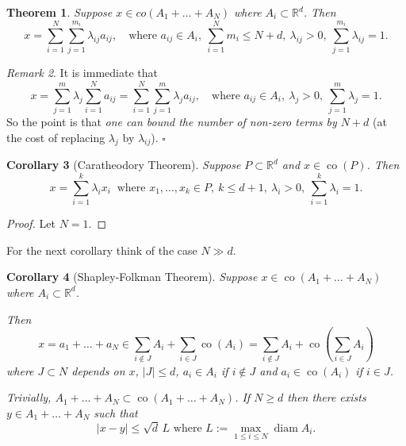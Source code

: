 \documentclass[a4paper]{amsart}
\theoremstyle{plain}
\newtheorem{theorem}{Theorem}[section]
\newtheorem{corollary}[theorem]{Corollary}
\theoremstyle{definition}
\theoremstyle{remark}
\newtheorem{remark}[theorem]{Remark}
\DeclareMathOperator{\co}{co}
\DeclareMathOperator{\diam}{diam}
\begin{document}
\begin{theorem}\label{mth}
Suppose $ x \in co (A_1 + \dots + A_N) $ where $ A_i \subset \mathbb{R}^d  $.  Then
\begin{equation} \label{} 
x = \sum_{i=1}^N \sum_{j=1} ^{m_i} \lambda _{ij} a_{ij} ,
\quad \text{where }  a_{ij}\in A_i,\  \sum_{i=1}^N m_i \leq N + d, \ \lambda _{ij} > 0 ,\ \sum_{j=1}^{m_i} \lambda _{ij} = 1.
\end{equation} 
\end{theorem} 

\begin{remark}\label{rem1}
It is immediate that 
\[
x = \sum_{j=1}^m \lambda _j \sum_{i=1}^N a_{ij} = \sum_{i=1}^N \sum_{j=1} ^{m } \lambda _{j} a_{ij} ,
\quad \text{where }  a_{ij}\in A_i,  \ \lambda _{j} > 0 ,\ \sum_{j=1}^{m } \lambda _{j} = 1.
\]
So the point is that \emph{one can bound the number of non-zero terms by $ N+ d$} (at the cost of replacing $ \lambda _j $ by $ \lambda _{ij} $).
\hfill $\square$  \end{remark} 

 
 \begin{corollary}[Caratheodory Theorem]
 Suppose $ P\subset \mathbb{R}^d  $ and $  x \in \co (P) $. Then
\begin{equation} 
 x = \sum_{i=1}^{ k } \lambda_i x_i\  \text{ where } x_1,\dots , x_k \in P,\  k \leq d+ 1,\  \lambda_i > 0 ,\ \sum_{i=1}^{ k } \lambda_i = 1.
\end{equation} 
\end{corollary}  

\begin{proof}
Let $ N=1 $.
\end{proof}

For the next corollary think of the case $ N \gg d $.
\begin{corollary}[Shapley-Folkman Theorem]  Suppose  $ x \in \co (A_1 + \dots + A_N) $ where $ A_i \subset \mathbb{R}^d  $.  

Then
\begin{equation} \label{sfd}
x = a_1 + \dots + a_N \in \sum_{i\notin J} A_i + \sum _{i\in J} \co(A_i) =  \sum_{i\notin J} A_i + \co \left(\sum _{i\in J}  A_i \right)
\end{equation}
where  $ J \subset N $ depends on $ x $,    $ |J|\leq d $, $ a_i \in A_i $ if $ i \notin J $ and $ a_i \in \co (A_i ) $ if $ i \in J $.

Trivially,  $ A_1 + \dots + A_N \subset \co (A_1 + \dots + A_N)$. 
If $ N \geq d $ then there exists $ y \in A_1 + \dots + A_N $ such that 
\begin{equation} \label{}
 |x-y| \leq \sqrt{d} \,L \text{ where } L := \max_{1 \leq i \leq N} \diam A_i .
 \end{equation} 
\end{corollary} 
\end{document}
